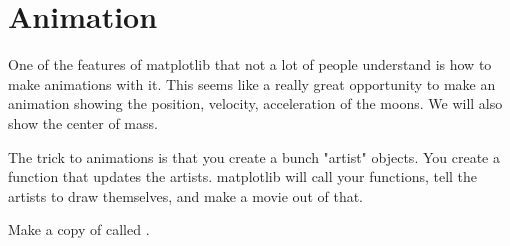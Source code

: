 \section{Animation}

One of the features of matplotlib that not a lot of people understand is how to make animations with it.  This
seems like a really great opportunity to make an animation showing the position, velocity, acceleration of the moons.  We will also show the center of mass.

The trick to animations is that you create a bunch "artist" objects.  You create a function that updates the 
artists. matplotlib will call your functions,  tell the artists to draw themselves,  and make a movie out of that.

Make a copy of  called . 

